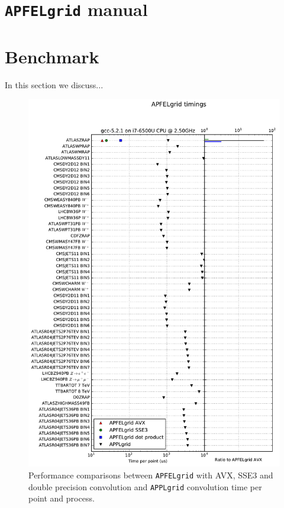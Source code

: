 \documentclass[preprint,12pt]{elsarticle}
\begin{document}
\section{{\tt APFELgrid} manual}

\section{Benchmark}

In this section we discuss...

\begin{figure}[ph]
\centering
\includegraphics[scale=0.5]{plots/t0}
\caption{\small Performance comparisons between {\tt APFELgrid} with
  AVX, SSE3 and double precision convolution and {\tt APPLgrid}
  convolution time per point and process.}
\label{fig:benchmark}
\end{figure}
\end{document}
